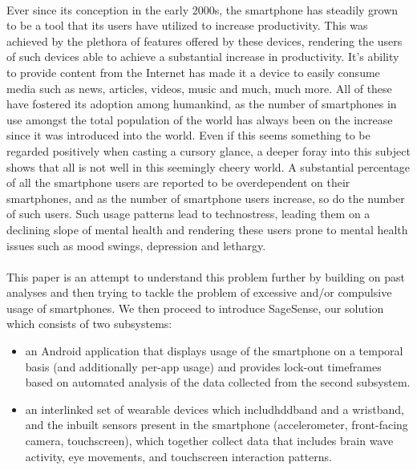 \documentclass{article}
\begin{document}
\paragraph{} Ever since its conception in the early 2000s, the smartphone has steadily grown to be a tool that its users have utilized to increase productivity. This was achieved by the plethora of features offered by these devices, rendering the users of such devices able to achieve a substantial increase in productivity. It's ability to provide content from the Internet has made it a device to easily consume media such as news, articles, videos, music and much, much more. All of these have fostered its adoption among humankind, as the number of smartphones in use amongst the total population of the world has always been on the increase since it was introduced into the world. Even if this seems something to be regarded positively when casting a cursory glance, a deeper foray into this subject shows that all is not well in this seemingly cheery world\cite{lee2014dark}. A substantial percentage of all the smartphone users are reported to be overdependent on their smartphones\cite{lopez2014prevalence, merlo2013measuring, lee2016dependency, davey2014assessment, eduardo2012mobile, koo2014risk}, and as the number of smartphone users increase, so do the number of such users. Such usage patterns lead to technostress\cite{brod1984technostress}, leading them on a declining slope of mental health and rendering these users prone to mental health issues such as mood swings, depression and lethargy.\cite{van2015modeling, lee2013relationship, choi2012influence, wang2014studentlife}

\paragraph{} This paper is an attempt to understand this problem further by building on past analyses and then trying to tackle the problem of excessive and/or compulsive usage of smartphones. We then proceed to introduce SageSense, our solution which consists of two subsystems:

\begin{itemize}
    \item an Android application that displays usage of the smartphone on a temporal basis (and additionally per-app usage) and provides lock-out timeframes based on automated analysis of the data collected from the second subsystem.
    \item an interlinked set of wearable devices which includhddband and a wristband, and the inbuilt sensors present in the smartphone (accelerometer, front-facing camera, touchscreen), which together collect data that includes brain wave activity, eye movements, and touchscreen interaction patterns.
\end{itemize}
\end{document}
